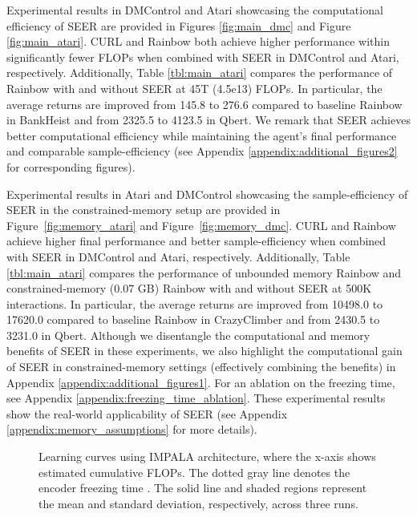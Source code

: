 \documentclass{article}
\begin{document}
Experimental results in DMControl and Atari showcasing the computational efficiency of SEER are provided in Figures \ref{fig:main_dmc} and Figure \ref{fig:main_atari}. 
CURL and Rainbow both achieve higher performance within significantly fewer FLOPs when combined with SEER in DMControl and Atari, respectively.
Additionally, Table \ref{tbl:main_atari} compares the performance of Rainbow with and without SEER at 45T (4.5e13) FLOPs. In particular, the average returns are improved from 145.8 to 276.6 compared to baseline Rainbow in BankHeist and from 2325.5 to 4123.5 in Qbert. We remark that SEER achieves better computational efficiency while maintaining the agent's final performance and comparable sample-efficiency (see Appendix \ref{appendix:additional_figures2} for corresponding figures).

Experimental results in Atari and DMControl showcasing the sample-efficiency of SEER in the constrained-memory setup are provided in Figure~\ref{fig:memory_atari} and Figure~\ref{fig:memory_dmc}. CURL and Rainbow achieve higher final performance and better sample-efficiency when combined with SEER in DMControl and Atari, respectively. 
Additionally, Table \ref{tbl:main_atari} compares the performance of unbounded memory Rainbow and constrained-memory (0.07 GB) Rainbow with and without SEER at 500K interactions. In particular, the average returns are improved from 10498.0 to 17620.0 compared to baseline Rainbow in CrazyClimber and from 2430.5 to 3231.0 in Qbert.
Although we disentangle the computational and memory benefits of SEER in these experiments, 
we also highlight the computational gain of SEER in constrained-memory settings (effectively combining the benefits) in Appendix \ref{appendix:additional_figures1}. For an ablation on the freezing time, see Appendix \ref{appendix:freezing_time_ablation}.
These experimental results show the real-world applicability of SEER (see Appendix \ref{appendix:memory_assumptions} for more details).


\begin{figure*} [t] \centering
{} 
\caption{Learning curves using IMPALA architecture, where the x-axis shows estimated cumulative FLOPs. The dotted gray line denotes the encoder freezing time . The solid line and shaded regions represent the mean and standard deviation, respectively, across three runs.}
\end{figure*} \label{fig:impala_plots}
\end{document}
